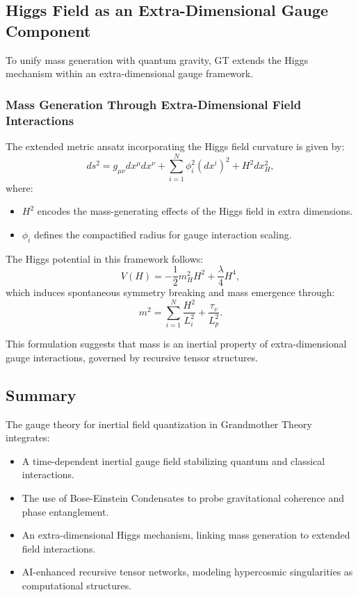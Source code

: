 \documentclass{article}
\theoremstyle{plain}
\begin{document}
\subsection{Higgs Field as an Extra-Dimensional Gauge Component}
To unify mass generation with quantum gravity, GT extends the Higgs mechanism within an extra-dimensional gauge framework.

\subsubsection{Mass Generation Through Extra-Dimensional Field Interactions}
The extended metric ansatz incorporating the Higgs field curvature is given by:
\begin{equation}
    ds^2 = g_{\mu\nu} dx^{\mu} dx^{\nu} + \sum_{i=1}^{N} \phi_i^2 (dx^i)^2 + H^2 dx_H^2,
\end{equation}
where:
\begin{itemize}
    \item $H^2$ encodes the mass-generating effects of the Higgs field in extra dimensions.
    \item $\phi_i$ defines the compactified radius for gauge interaction scaling.
\end{itemize}

The Higgs potential in this framework follows:
\begin{equation}
    V(H) = -\frac{1}{2} m_H^2 H^2 + \frac{\lambda}{4} H^4,
\end{equation}
which induces spontaneous symmetry breaking and mass emergence through:
\begin{equation}
    m^2 = \sum_{i=1}^{N} \frac{H^2}{L_i^2} + \frac{\tau_v}{L_p^2}.
\end{equation}

This formulation suggests that mass is an inertial property of extra-dimensional gauge interactions, governed by recursive tensor structures.

\subsection{Summary}
The gauge theory for inertial field quantization in Grandmother Theory integrates:
\begin{itemize}
    \item A time-dependent inertial gauge field stabilizing quantum and classical interactions.
    \item The use of Bose-Einstein Condensates to probe gravitational coherence and phase entanglement.
    \item An extra-dimensional Higgs mechanism, linking mass generation to extended field interactions.
    \item AI-enhanced recursive tensor networks, modeling hypercosmic singularities as computational structures.
\end{itemize}
\end{document}
